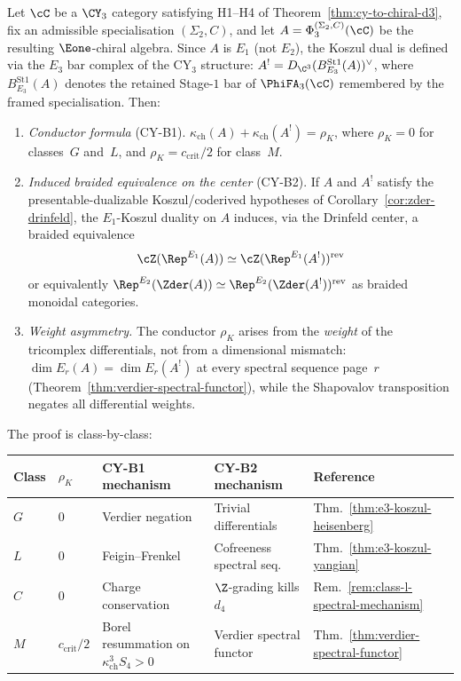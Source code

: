 \begin{theorem}[CY-B at \texorpdfstring{$d = 3$}{d = 3}: \texorpdfstring{$E_1$}{E-1}-chiral Koszul duality
(inducing \texorpdfstring{$E_2$}{E-2} on the center)]
\label{thm:cy-b-d3}
Let $\cC$ be a $\CY_3$ category satisfying H1--H4 of Theorem~\textup{\ref{thm:cy-to-chiral-d3}}, fix an admissible specialisation $(\Sigma_2,C)$, and let $A = \Phi_3^{(\Sigma_2,C)}(\cC)$ be the resulting $\Eone$-chiral
algebra. Since $A$ is
$E_1$ (not $E_2$), the Koszul dual is defined via the $E_3$ bar complex
of the CY$_3$ structure:
$A^! = D_{\C^3}(B_{E_3}^{\mathrm{St1}}(A))^\vee$, where
$B_{E_3}^{\mathrm{St1}}(A)$ denotes the retained Stage-$1$ bar of
$\PhiFA_3(\cC)$ remembered by the framed specialisation. Then:
\begin{enumerate}[label=\textup{(\roman*)}]
 \item \emph{Conductor formula} (CY-B1).
 $\kappa_{\mathrm{ch}}(A) + \kappa_{\mathrm{ch}}(A^!) = \rho_K$,
 where $\rho_K = 0$ for classes~$G$ and~$L$, and
 $\rho_K = c_{\mathrm{crit}}/2$ for class~$M$.
 \item \emph{Induced braided equivalence on the center} (CY-B2).
 If $A$ and $A^!$ satisfy the presentable-dualizable
 Koszul/coderived hypotheses of
 Corollary~\ref{cor:zder-drinfeld}, the $E_1$-Koszul duality on $A$
 induces, via the Drinfeld center, a braided equivalence
 \[
 \cZ(\Rep^{E_1}(A)) \simeq \cZ(\Rep^{E_1}(A^!))^{\mathrm{rev}}
 \]
 or equivalently $\Rep^{E_2}(\Zder(A)) \simeq
 \Rep^{E_2}(\Zder(A^!))^{\mathrm{rev}}$
 as braided monoidal categories.
 \item \emph{Weight asymmetry.}
 The conductor $\rho_K$ arises from the \emph{weight} of the tricomplex
 differentials, not from a dimensional mismatch: $\dim E_r(A) = \dim E_r(A^!)$
 at every spectral sequence page~$r$ (Theorem~\textup{\ref{thm:verdier-spectral-functor}}),
 while the Shapovalov transposition negates all differential weights.
\end{enumerate}
The proof is class-by-class:
\begin{center}
\renewcommand{\arraystretch}{1.3}
\small
\begin{tabular}{lllll}
 \toprule
 \textbf{Class} & $\rho_K$ & \textbf{CY-B1 mechanism} &
 \textbf{CY-B2 mechanism} & \textbf{Reference} \\
 \midrule
 $G$ & $0$ & Verdier negation & Trivial differentials &
 Thm.~\ref{thm:e3-koszul-heisenberg} \\
 $L$ & $0$ & Feigin--Frenkel & Cofreeness spectral seq.\ &
 Thm.~\ref{thm:e3-koszul-yangian} \\
 $C$ & $0$ & Charge conservation & $\Z$-grading kills $d_4$ &
 Rem.~\ref{rem:class-l-spectral-mechanism} \\
 $M$ & $c_{\mathrm{crit}}/2$ & Borel resummation on $\kappa_{\mathrm{ch}}^3S_4>0$ &
 Verdier spectral functor &
 Thm.~\ref{thm:verdier-spectral-functor} \\
 \bottomrule
\end{tabular}
\end{center}
\end{theorem}

